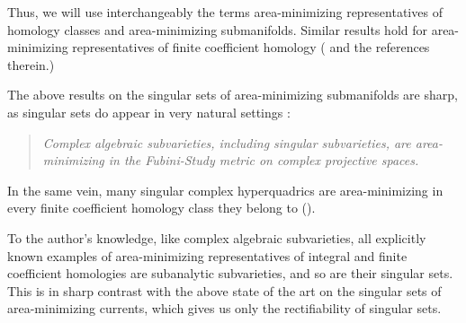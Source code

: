 \documentclass[11pt,a4paper]{amsart}
\numberwithin{equation}{section}
\theoremstyle{plain}
\theoremstyle{definition}
\numberwithin{equation}{subsection}
\begin{document}
	Thus, we will use interchangeably the terms area-minimizing representatives of homology classes and area-minimizing submanifolds. Similar results hold for area-minimizing representatives of finite coefficient homology (\cite{DMSmod} and the references therein.)
	
	The above results on the singular sets of area-minimizing submanifolds are sharp, as singular sets do appear in very natural settings \cite[Section 4]{MR0168727}:
	\begin{quote}
		\emph{Complex algebraic subvarieties, including singular subvarieties, are area-minimizing in the Fubini-Study metric on complex projective spaces.}
	\end{quote}
	In the same vein, many singular complex hyperquadrics are area-minimizing in every finite coefficient homology class they belong to (\cite{FMcalv}). 
	
	To the author's knowledge, like complex algebraic subvarieties, all explicitly known examples of area-minimizing representatives of integral and finite coefficient homologies are subanalytic subvarieties, and so are their singular sets. This is in sharp contrast with the above state of the art on the singular sets of area-minimizing currents, which gives us only the rectifiability of singular sets. 
	
\end{document}
